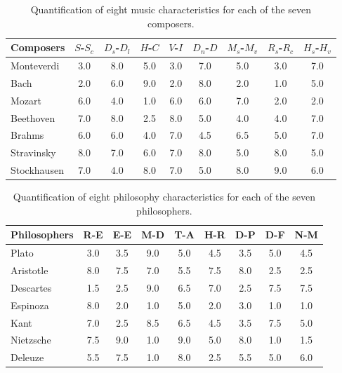 \documentclass[
 aip,
 jmp,
 amsmath,amssymb,
 reprint,
]{revtex4-1}
\begin{document}
\begin{table}[ht]
  \caption{\label{tab:tableAmus} Quantification of eight music
    characteristics for each of the seven composers.}
  \begin{ruledtabular}
    \begin{tabular}{|l|c|c|c|c|c|c|c|c|}
      \footnotesize Composers    & \tiny  $S$-$S_c$ 
      & \tiny  $D_s$-$D_l$ & \tiny  $H$-$C$ & \tiny  $V$-$I$ 
      & \tiny  $D_n$-$D$ & \tiny  $M_s$-$M_v$ & \tiny  $R_s$-$R_c$
      & \tiny  $H_s$-$H_v$  \\
      \hline
   \footnotesize Monteverdi  & 3.0 & 8.0 & 5.0 & 3.0 & 7.0 & 5.0 & 3.0 & 7.0 
   \\
   \footnotesize Bach        & 2.0 & 6.0 & 9.0 & 2.0 & 8.0 & 2.0 & 1.0 & 5.0 
   \\
   \footnotesize Mozart      & 6.0 & 4.0 & 1.0 & 6.0 & 6.0 & 7.0 & 2.0 & 2.0 
   \\
   \footnotesize Beethoven   & 7.0 & 8.0 & 2.5 & 8.0 & 5.0 & 4.0 & 4.0 & 7.0 
   \\
   \footnotesize Brahms      & 6.0 & 6.0 & 4.0 & 7.0 & 4.5 & 6.5 & 5.0 & 7.0 
   \\
   \footnotesize Stravinsky  & 8.0 & 7.0 & 6.0 & 7.0 & 8.0 & 5.0 & 8.0 & 5.0 
   \\
   \footnotesize Stockhausen & 7.0 & 4.0 & 8.0 & 7.0 & 5.0 & 8.0 & 9.0 & 6.0 
   \\
    \end{tabular}
  \end{ruledtabular}
\end{table}

\begin{table}%
  \caption{\label{tab:tableAphi} Quantification of eight philosophy
    characteristics for each of the seven philosophers.}

  \begin{ruledtabular}
    \begin{tabular}{|l||c|c|c|c|c|c|c|c|}
      Philosophers & R-E & E-E & M-D & T-A & H-R & D-P & D-F & N-M \\ \hline
      Plato        & 3.0 & 3.5 & 9.0 & 5.0 & 4.5 & 3.5 & 5.0 & 4.5 \\
      Aristotle    & 8.0 & 7.5 & 7.0 & 5.5 & 7.5 & 8.0 & 2.5 & 2.5 \\
      Descartes    & 1.5 & 2.5 & 9.0 & 6.5 & 7.0 & 2.5 & 7.5 & 7.5 \\
      Espinoza     & 8.0 & 2.0 & 1.0 & 5.0 & 2.0 & 3.0 & 1.0 & 1.0 \\
      Kant         & 7.0 & 2.5 & 8.5 & 6.5 & 4.5 & 3.5 & 7.5 & 5.0 \\
      Nietzsche    & 7.5 & 9.0 & 1.0 & 9.0 & 5.0 & 8.0 & 1.0 & 1.5 \\
      Deleuze      & 5.5 & 7.5 & 1.0 & 8.0 & 2.5 & 5.5 & 5.0 & 6.0 \\
    \end{tabular}
  \end{ruledtabular}
\end{table}
\end{document}
